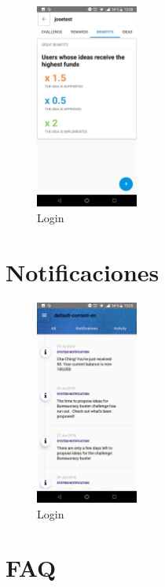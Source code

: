 \begin{figure}[!h]
	\begin{center}
		\includegraphics[width=0.3\textwidth]{./img/anexo1/ver_desafio_beneficios.png}
		\caption{Login}
		\label{fig:ver_desafio_inicio_beneficios}
	\end{center}
\end{figure}


\section{Notificaciones}

\begin{figure}[!h]
	\begin{center}
		\includegraphics[width=0.3\textwidth]{./img/anexo1/notificaciones_all.png}
		\caption{Login}
		\label{fig:notificaciones}
	\end{center}
\end{figure}

\section{FAQ}
